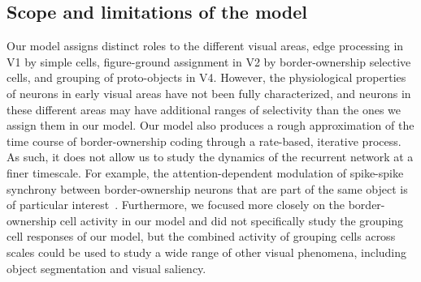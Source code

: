 \subsection{Scope and limitations of the model}
Our model assigns distinct roles to the
different visual areas,  \eg edge processing in V1 by simple cells, figure-ground
assignment in V2 by border-ownership selective cells, and grouping of proto-objects in V4. However,
the physiological properties of neurons in early visual areas have not
been fully characterized, and 
neurons in these different
areas may have 
additional ranges of selectivity
than the ones we assign them in our model. 
Our model also produces a rough approximation of the time course of border-ownership
coding through a rate-based, iterative process. As such, it does not allow us to study the dynamics of the recurrent network at a finer timescale. For example, the attention-dependent modulation of spike-spike synchrony between border-ownership neurons that are part of the same object is of particular interest~\citep{Martin_vonderHeydt15,Wagatsuma_etal16a}. Furthermore, we focused more closely on the border-ownership cell activity in our model and did not specifically study the grouping cell responses of our model, but the combined activity of grouping cells across scales could be used to
study a wide range of other visual phenomena, including object segmentation and visual saliency.

